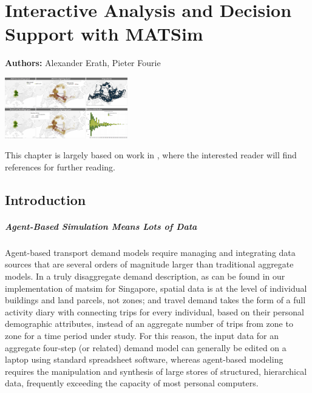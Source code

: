 \chapter{Interactive Analysis and Decision Support with MATSim}
\label{ch:businessanalytics}

\hfill \textbf{Authors:} Alexander Erath, Pieter Fourie

\begin{center} \includegraphics[width=0.4\textwidth, angle=0]{extending/figures/businessanalytics/tableau.png} \end{center}


This chapter is largely based on work in \citet[][]{ErathEtAl_EASTS_2013}, where the interested reader will find references for further reading.
\section{Introduction}
\label{sec:analyticsIntro}
\paragraph{Agent-Based Simulation Means Lots of Data}
Agent-based transport demand models require managing and integrating data sources that are several orders of magnitude larger than traditional aggregate models. In a truly disaggregate demand description, as can be found in our implementation of \gls{matsim} for Singapore, spatial data is at the level of individual buildings and land parcels, not zones; and travel demand takes the form of a full activity diary with connecting trips for every individual, based on their personal demographic attributes, instead of an aggregate number of trips from zone to zone for a time period under study. For this reason, the input data for an aggregate four-step (or related) demand model can generally be edited on a laptop using standard spreadsheet software, whereas agent-based modeling requires the manipulation and synthesis of large stores of structured, hierarchical data, frequently exceeding the capacity of most personal computers. %

